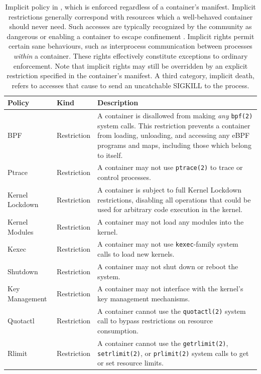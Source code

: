 \begin{table}[htpb]
  \small
  \centering
  \caption{
    Implicit policy in \bpfcontain{}, which is enforced regardless of a container's manifest. Implicit restrictions generally correspond with resources which a well-behaved container should never need. Such accesses are typically recognized by the community as dangerous or enabling a container to escape confinement . Implicit rights permit certain sane behaviours, such as interprocess communication between processes \textit{within} a container. These rights effectively constitute exceptions to ordinary enforcement. Note that implicit rights may still be overridden by an explicit restriction specified in the container's manifest. A third category, implicit death, refers to accesses that cause \bpfcontain{} to send an uncatchable SIGKILL to the process.
  }
  \label{tab:implicit}
  \begin{tabular}{llp{25em}}
  \toprule
  Policy & Kind & Description \\
  \midrule
  BPF & Restriction &
    A container is disallowed from making \textit{any} \texttt{bpf(2)} system calls. This restriction prevents a container from loading, unloading, and accessing any eBPF programs and maps, including those which belong to \bpfcontain{} itself. \\
  Ptrace & Restriction &
    A container may not use \texttt{ptrace(2)} to trace or control processes. \\
  Kernel Lockdown & Restriction &
    A container is subject to full Kernel Lockdown \cite{lockdown} restrictions, disabling all operations that could be used for arbitrary code execution in the kernel. \\
  Kernel Modules & Restriction &
    A container may not load any modules into the kernel. \\
  Kexec & Restriction &
    A container may not use \texttt{kexec}-family system calls to load new kernels. \\
  Shutdown & Restriction &
    A container may not shut down or reboot the system. \\
  Key Management & Restriction &
    A container may not interface with the kernel's key management mechanisms. \\
  Quotactl & Restriction &
    A container cannot use the \texttt{quotactl(2)} system call to bypass restrictions on resource consumption. \\
  Rlimit & Restriction &
    A container cannot use the \texttt{getrlimit(2)}, \texttt{setrlimit(2)}, or \texttt{prlimit(2)} system calls to get or set resource limits. \\

\end{tabular}
\end{table}
